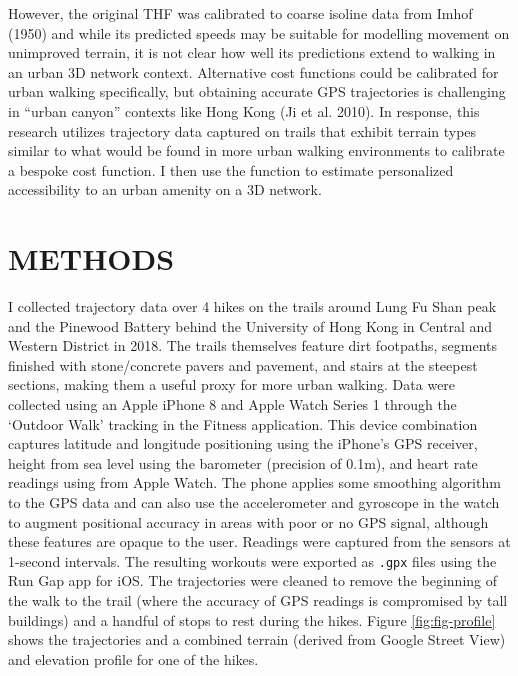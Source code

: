\documentclass{article}
\begin{document}
However, the original THF was calibrated to coarse isoline data from
Imhof (1950) and while its predicted speeds may be suitable for
modelling movement on unimproved terrain, it is not clear how well its
predictions extend to walking in an urban 3D network context.
Alternative cost functions could be calibrated for urban walking
specifically, but obtaining accurate GPS trajectories is challenging in
``urban canyon'' contexts like Hong Kong (Ji et al. 2010). In response,
this research utilizes trajectory data captured on trails that exhibit
terrain types similar to what would be found in more urban walking
environments to calibrate a bespoke cost function. I then use the
function to estimate personalized accessibility to an urban amenity on a
3D network.

\hypertarget{methods}{%
\section{METHODS}\label{methods}}

I collected trajectory data over 4 hikes on the trails around Lung Fu
Shan peak and the Pinewood Battery behind the University of Hong Kong in
Central and Western District in 2018. The trails themselves feature dirt
footpaths, segments finished with stone/concrete pavers and pavement,
and stairs at the steepest sections, making them a useful proxy for more
urban walking. Data were collected using an Apple iPhone 8 and Apple
Watch Series 1 through the `Outdoor Walk' tracking in the Fitness
application. This device combination captures latitude and longitude
positioning using the iPhone's GPS receiver, height from sea level using
the barometer (precision of 0.1m), and heart rate readings using from
Apple Watch. The phone applies some smoothing algorithm to the GPS data
and can also use the accelerometer and gyroscope in the watch to augment
positional accuracy in areas with poor or no GPS signal, although these
features are opaque to the user. Readings were captured from the sensors
at 1-second intervals. The resulting workouts were exported as
\texttt{.gpx} files using the Run Gap app for iOS. The trajectories were
cleaned to remove the beginning of the walk to the trail (where the
accuracy of GPS readings is compromised by tall buildings) and a handful
of stops to rest during the hikes. Figure \ref{fig:fig-profile} shows
the trajectories and a combined terrain (derived from Google Street
View) and elevation profile for one of the hikes.
\end{document}
